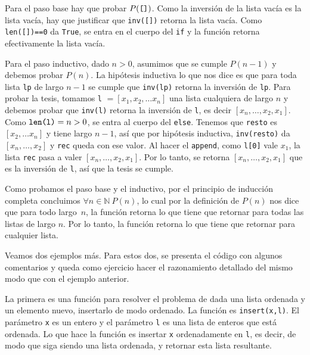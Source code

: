 \documentclass[a4paper, 12pt]{report}
\newcommand{\N}{\mathbb{N}}
\newcommand{\te}{\text}
\theoremstyle{definition}
\begin{document}
Para el paso base hay que probar $P(\te{{\tt[]}})$. Como la inversión de la lista vacía es la lista vacía, hay que justificar que {\tt inv([])} retorna la lista vacía. Como {\tt len([])==0} da {\tt True}, se entra en el cuerpo del {\tt if} y la función retorna efectivamente la lista vacía.

Para el paso inductivo, dado $n>0$, asumimos que se cumple $P(n-1)$ y debemos probar $P(n)$. La hipótesis inductiva lo que nos dice es que para toda lista {\tt lp} de largo $n-1$ se cumple que {\tt inv(lp)} retorna la inversión de {\tt lp}. Para probar la tesis, tomamos {\tt l} $=[x_1,x_2,\dots x_n]$ una lista cualquiera de largo $n$ y debemos probar que {\tt inv(l)} retorna la inversión de {\tt l}, es decir $[x_n,\dots,x_2,x_1]$. Como $\te{{\tt len(l)}}=n>0$, se entra al cuerpo del {\tt else}. Tenemos que  {\tt resto} es $[x_2,\dots x_n]$ y tiene largo $n-1$, así que por hipótesis inductiva, {\tt inv(resto)} da $[x_n,\dots,x_2]$ y {\tt rec} queda con ese valor. Al hacer el {\tt append}, como {\tt l[0]} vale $x_1$, la lista {\tt rec} pasa a valer $[x_n,\dots,x_2,x_1]$. Por lo tanto, se retorna $[x_n,\dots,x_2,x_1]$ que es la inversión de {\tt l}, así que la tesis se cumple.

Como probamos el paso base y el inductivo, por el principio de inducción completa concluimos $\forall n\in\N~P(n)$, lo cual por la definición de $P(n)$ nos dice que para todo largo~$n$, la función retorna lo que tiene que retornar para todas las listas de largo $n$. Por lo tanto, la función retorna lo que tiene que retornar para cualquier lista.

\vspace{0.5em}
Veamos dos ejemplos más. Para estos dos, se presenta el código con algunos comentarios y queda como ejercicio hacer el razonamiento detallado del mismo modo que con el ejemplo anterior.

La primera es una función para resolver el problema de dada una lista ordenada y un elemento nuevo, insertarlo de modo ordenado. La función es {\tt insert(x,l)}. El parámetro {\tt x} es un entero y el parámetro {\tt l} es una lista de enteros que está ordenada. Lo que hace la función es insertar {\tt x} ordenadamente en {\tt l}, es decir, de modo que siga siendo una lista ordenada, y retornar esta lista resultante.
\end{document}
